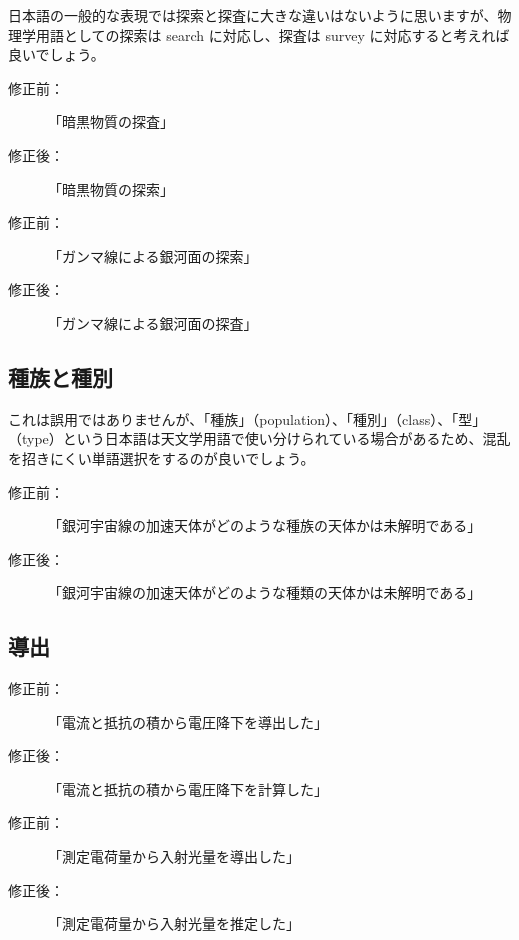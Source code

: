 日本語の一般的な表現では探索と探査に大きな違いはないように思いますが、物理学用語としての探索は search に対応し、探査は survey に対応すると考えれば良いでしょう。

\begin{description}
\item[修正前：]「暗黒物質の探査」
\item[修正後：]「暗黒物質の探索」
\end{description}

\begin{description}
\item[修正前：]「ガンマ線による銀河面の探索」
\item[修正後：]「ガンマ線による銀河面の探査」
\end{description}

\subsection{種族と種別}

これは誤用ではありませんが、「種族」（population）、「種別」（class）、「型」（type）という日本語は天文学用語で使い分けられている場合があるため、混乱を招きにくい単語選択をするのが良いでしょう。

\begin{description}
\item[修正前：]「銀河宇宙線の加速天体がどのような種族の天体かは未解明である」
\item[修正後：]「銀河宇宙線の加速天体がどのような種類の天体かは未解明である」
\end{description}




\subsection{導出}

\begin{description}
\item[修正前：]「電流と抵抗の積から電圧降下を導出した」
\item[修正後：]「電流と抵抗の積から電圧降下を計算した」
\end{description}
\begin{description}
\item[修正前：]「測定電荷量から入射光量を導出した」
\item[修正後：]「測定電荷量から入射光量を推定した」
\end{description}

